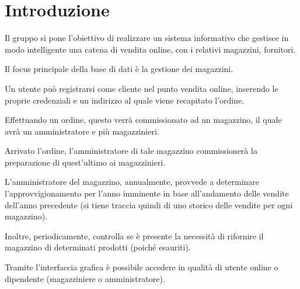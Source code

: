 \section{Introduzione}

Il gruppo si pone l'obiettivo di realizzare un sistema informativo che gestisce in modo intelligente una catena di vendita online, con i relativi magazzini, fornitori.

Il focus principale della base di dati è la gestione dei magazzini.

Un utente può registrarsi come cliente nel punto vendita online, inserendo le proprie credenziali e un indirizzo al quale viene recapitato l’ordine.

Effettuando un ordine, questo verrà commissionato ad un magazzino, il quale avrà un amministratore e più magazzinieri.

Arrivato l’ordine, l’amministratore di tale magazzino commissionerà la preparazione di quest’ultimo ai magazzinieri.

L’amministratore del magazzino, annualmente, provvede a determinare l’approvvigionamento per l’anno imminente in base all’andamento delle vendite dell’anno precedente (si tiene traccia quindi di uno storico delle vendite per ogni magazzino).

Inoltre, periodicamente, controlla se è presente la necessità di rifornire il magazzino di determinati prodotti (poiché esauriti).

Tramite l'interfaccia grafica è possibile accedere in qualità di utente online o dipendente (magazziniere o amministratore).
